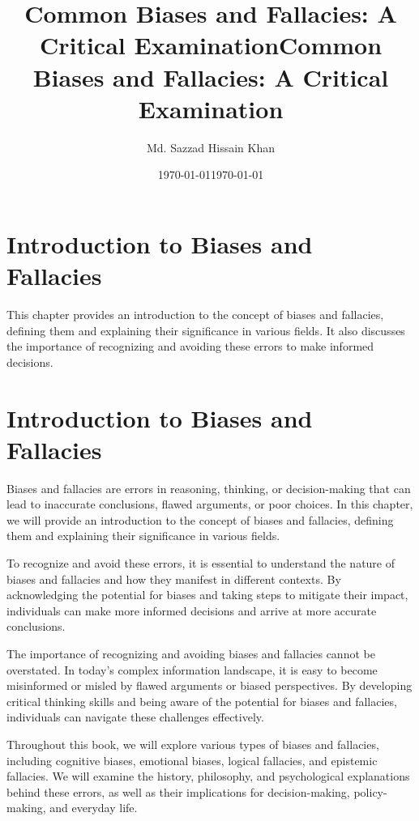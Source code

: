 \documentclass{report}%
\title{Common Biases and Fallacies: A Critical Examination}%
\date{\today}%
\title{Common Biases and Fallacies: A Critical Examination}%
\author{Md. Sazzad Hissain Khan}%
\date{\today}%
\begin{document}
%
\normalsize%
\maketitle%
\tableofcontents%
%
\chapter{Introduction to Biases and Fallacies}%
This chapter provides an introduction to the concept of biases and fallacies, defining them and explaining their significance in various fields. It also discusses the importance of recognizing and avoiding these errors to make informed decisions.

%
\chapter{Introduction to Biases and Fallacies}

Biases and fallacies are errors in reasoning, thinking, or decision-making that can lead to inaccurate conclusions, flawed arguments, or poor choices. In this chapter, we will provide an introduction to the concept of biases and fallacies, defining them and explaining their significance in various fields.

To recognize and avoid these errors, it is essential to understand the nature of biases and fallacies and how they manifest in different contexts. By acknowledging the potential for biases and taking steps to mitigate their impact, individuals can make more informed decisions and arrive at more accurate conclusions.

The importance of recognizing and avoiding biases and fallacies cannot be overstated. In today's complex information landscape, it is easy to become misinformed or misled by flawed arguments or biased perspectives. By developing critical thinking skills and being aware of the potential for biases and fallacies, individuals can navigate these challenges effectively.

Throughout this book, we will explore various types of biases and fallacies, including cognitive biases, emotional biases, logical fallacies, and epistemic fallacies. We will examine the history, philosophy, and psychological explanations behind these errors, as well as their implications for decision-making, policy-making, and everyday life.
\end{document}
